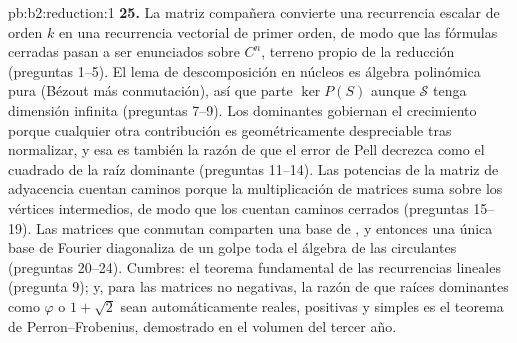 \begin{solution}{pb:b2:reduction:1}
\textbf{25.} La matriz compañera convierte una recurrencia escalar
de orden $k$ en una recurrencia vectorial de primer orden, de modo
que las fórmulas cerradas pasan a ser enunciados sobre $C^n$,
terreno propio de la reducción (preguntas 1--5). El lema de
descomposición en núcleos es álgebra polinómica pura (Bézout más
conmutación), así que parte $\ker P(S)$ aunque $\mathcal{S}$ tenga
dimensión infinita (preguntas 7--9). Los 
dominantes gobiernan el crecimiento porque cualquier otra
contribución es geométricamente despreciable tras normalizar, y
esa es también la razón de que el error de Pell decrezca como el
cuadrado de la raíz dominante (preguntas 11--14). Las potencias de
la matriz de adyacencia cuentan caminos porque la multiplicación
de matrices suma sobre los vértices intermedios, de modo que los
 cuentan caminos cerrados (preguntas 15--19). Las
matrices que conmutan comparten una base de , y
entonces una única base de Fourier diagonaliza de un golpe toda el
álgebra de las circulantes (preguntas 20--24). Cumbres: el teorema
fundamental de las recurrencias lineales (pregunta 9); y, para las
matrices no negativas, la razón de que raíces dominantes como
$\varphi$ o $1 + \sqrt2$ sean automáticamente reales, positivas y
simples es el teorema de Perron--Frobenius, demostrado en el
volumen del tercer año.
\end{solution}
